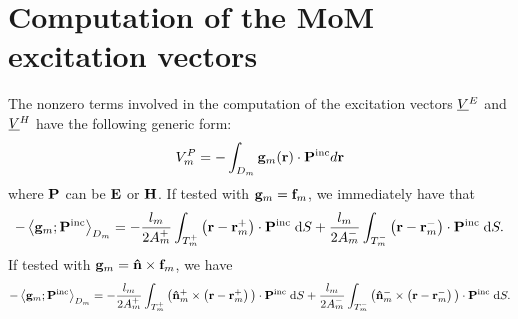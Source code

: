 \section{Computation of the MoM excitation vectors}
\label{app:Computation of the MoM excitation vectors}
%
\par
The nonzero terms involved in the computation of the excitation vectors $\underline{V} \thinspace \negthinspace _{} ^{E}$ and $\underline{V} \thinspace \negthinspace _{} ^{H}$ have the following generic form:
\begin{equation}
V_m^{P} = -\int_{D_m}\mathbf{g}_m \!\left(\mathbf{r}\right) \cdot \mathbf{P}^\text{inc} d\mathbf{r}
\end{equation}
where $\mathbf{P}$ can be $\mathbf{E}$ or $\mathbf{H}$. If tested with $\mathbf{g}_m = \mathbf{f}_m$, we immediately have that
\begin{equation}
-\left\langle \mathbf{g}_m ; \mathbf{P}^\text{inc} \right\rangle_{D_m} = -\frac{l_m}{2 A_m^+}\int_{T_m^+} \left(\mathbf{r} - \mathbf{r}_m^+ \right) \cdot \mathbf{P}^\text{inc} \; \text{d} S + \frac{l_m}{2 A_m^-}\int_{T_m^-} \left(\mathbf{r} - \mathbf{r}_m^- \right) \cdot \mathbf{P}^\text{inc} \; \text{d} S.
\end{equation}
If tested with $\mathbf{g}_m = \mathbf{\Hat{n}} \times \mathbf{f}_m$, we have 
\begin{equation}
-\left\langle \mathbf{g}_m ; \mathbf{P}^\text{inc} \right\rangle_{D_m} = -\frac{l_m}{2 A_m^+}\int_{T_m^+} \big( \mathbf{\Hat{n}}_m^+ \times \left(\mathbf{r} - \mathbf{r}_m^+ \right) \big) \cdot \mathbf{P}^\text{inc} \; \text{d} S + \frac{l_m}{2 A_m^-}\int_{T_m^-} \big( \mathbf{\Hat{n}}_m^- \times \left(\mathbf{r} - \mathbf{r}_m^- \right)\big) \cdot \mathbf{P}^\text{inc} \; \text{d} S.
\end{equation}





